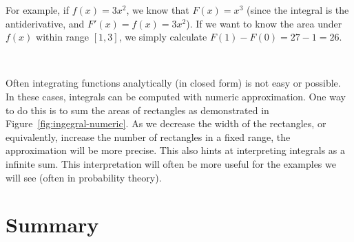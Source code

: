 For example, if $f(x) = 3 x^{2}$,
we know that $F(x) = x^{3}$ (since the integral is the antiderivative,
and $F'(x) = f(x) = 3 x^{2}$).
If we want to know the area under $f(x)$ within range $[1, 3]$,
we simply calculate $F(1) - F(0) = 27 - 1 = 26$.

\begin{marginfigure}
  \\
  \caption{\label{fig:ingegral-numeric}%
    Demonstration of numerical approximation to an integral.
    Note that as the rectangles get smaller (as in the figure below),
    sum of their areas gets closer to the area under the curve.
  }
\end{marginfigure}
Often integrating functions analytically
(in closed form) is not easy or possible.
In these cases, integrals can be computed with numeric approximation.
One way to do this is to sum the areas of rectangles
as demonstrated in Figure~\ref{fig:ingegral-numeric}.
As we decrease the width of the rectangles,
or equivalently, increase the number of rectangles in a fixed range,
the approximation will be more precise.
This also hints at interpreting integrals as a infinite sum.
This interpretation will often be more useful
for the examples we will see (often in probability theory).

\section*{Summary}

